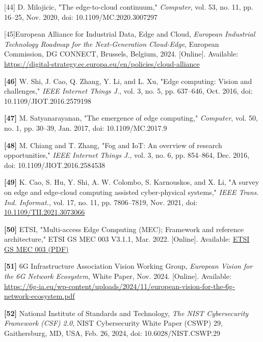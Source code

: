 \documentclass{ieeeaccess}
\begin{document}
{[}44{]} D. Milojicic, "The edge-to-cloud continuum," \emph{Computer},
vol. 53, no. 11, pp. 16--25, Nov. 2020, doi: 10.1109/MC.2020.3007297

{[}45{]}European Alliance for Industrial Data, Edge and Cloud,
\emph{European Industrial Technology Roadmap for the Next-Generation
Cloud-Edge}, European Commission, DG CONNECT, Brussels, Belgium, 2024.
{[}Online{]}. Available:
\href{https://digital-strategy.ec.europa.eu/en/policies/cloud-alliance}{https://digital-strategy.ec.europa.eu/en/policies/cloud-alliance}

\textbf{{[}46{]}} W. Shi, J. Cao, Q. Zhang, Y. Li, and L. Xu, "Edge
computing: Vision and challenges," \emph{IEEE Internet Things J.}, vol.
3, no. 5, pp. 637--646, Oct. 2016, doi: 10.1109/JIOT.2016.2579198

\textbf{{[}47{]}} M. Satyanarayanan, "The emergence of edge computing,"
\emph{Computer}, vol. 50, no. 1, pp. 30--39, Jan. 2017, doi:
10.1109/MC.2017.9

\textbf{{[}48{]}} M. Chiang and T. Zhang, "Fog and IoT: An overview of
research opportunities," \emph{IEEE Internet Things J.}, vol. 3, no. 6,
pp. 854--864, Dec. 2016, doi: 10.1109/JIOT.2016.2584538

\textbf{{[}49{]}} K. Cao, S. Hu, Y. Shi, A. W. Colombo, S. Karnouskos,
and X. Li, "A survey on edge and edge-cloud computing assisted
cyber-physical systems," \emph{IEEE Trans. Ind. Informat.}, vol. 17, no.
11, pp. 7806--7819, Nov. 2021, doi:
\href{https://doi.org/10.1109/TII.2021.3073066}{10.1109/TII.2021.3073066}

\textbf{{[}50{]}} ETSI, "Multi-access Edge Computing (MEC); Framework
and reference architecture," ETSI GS MEC 003 V3.1.1, Mar. 2022.
{[}Online{]}. Available:
\href{https://www.etsi.org/deliver/etsi_gs/MEC/001_099/003/03.01.01_60/gs_MEC003v030101p.pdf}{ETSI GS MEC 003 (PDF)}

\textbf{{[}51{]}} 6G Infrastructure Association Vision Working Group,
\emph{European Vision for the 6G Network Ecosystem}, White Paper, Nov.
2024. {[}Online{]}. Available:
\href{https://6g-ia.eu/wp-content/uploads/2024/11/european-vision-for-the-6g-network-ecosystem.pdf}{https://6g-ia.eu/wp-content/uploads/2024/11/european-vision-for-the-6g-network-ecosystem.pdf}

\textbf{{[}52{]}} National Institute of Standards and Technology,
\emph{The NIST Cybersecurity Framework (CSF) 2.0}, NIST Cybersecurity
White Paper (CSWP) 29, Gaithersburg, MD, USA, Feb. 26, 2024, doi:
10.6028/NIST.CSWP.29
\end{document}
